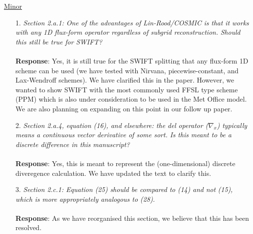 \documentclass[11pt,a4paper]{article}
\begin{document}
\underline{Minor}
\begin{enumerate}[leftmargin=*]
\item[1.] \textit{Section 2.a.1: One of the advantages of Lin-Rood/COSMIC is that it works with any 1D flux-form operator regardless of subgrid reconstruction. Should this still be true for SWIFT?} \\
\\
\textbf{Response}: Yes, it is still true for the SWIFT splitting that any flux-form 1D scheme can be used (we have tested with Nirvana, piecewise-constant, and Lax-Wendroff schemes). We have clarified this in the paper. However, we wanted to show SWIFT with the most commonly used FFSL type scheme (PPM) which is also under consideration to be used in the Met Office model. We are also planning on expanding on this point in our follow up paper.

\item[2.] \textit{Section 2.a.4, equation (16), and elsewhere: the del operator ($\nabla_x$) typically means a continuous vector derivative of some sort. Is this meant to be a discrete difference in this
manuscript?} \\
\\
\textbf{Response}: Yes, this is meant to represent the (one-dimensional) discrete diveregence calculation. We have updated the text to clarify this.

\item[3.] \textit{Section 2.c.1: Equation (25) should be compared to (14) and not (15), which is more appropriately analogous to (28).} \\
\\
\textbf{Response}: As we have reorganised this section, we believe that this has been resolved.

\end{enumerate}
\end{document}
